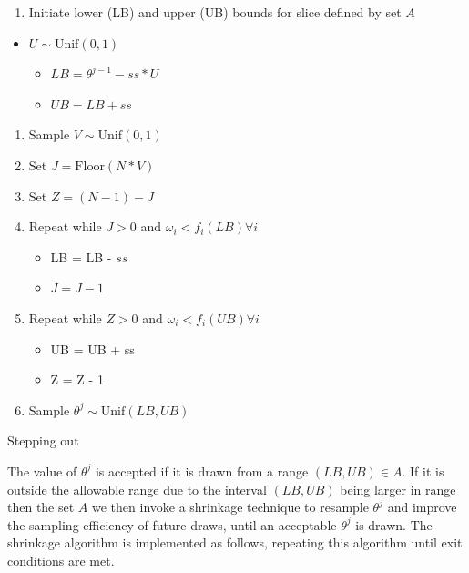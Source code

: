 \documentclass[article]{jss}
\begin{document}
%
\begin{algorithm}[H]
\begin{enumerate}
\item Initiate lower (LB) and upper (UB) bounds for slice defined by set
$A$\end{enumerate}
\begin{itemize}
\item $U\sim\mbox{Unif}(0,1)$ 

\begin{itemize}
\item $LB=\theta^{j-1}-ss*U$ 
\item $UB=LB+ss$ 
\end{itemize}
\end{itemize}
\begin{enumerate}
\item Sample $V\sim\mbox{Unif}(0,1)$ 
\item Set $J=\mbox{Floor}(N*V)$ 
\item Set $Z=(N-1)-J$ 
\item Repeat while $J>0$ and $\omega_{i}<f_{i}(LB)\forall i$

\begin{itemize}
\item LB = LB - $ss$ 
\item $J=J-1$ 
\end{itemize}
\item Repeat while $Z>0$ and $\omega_{i}<f_{i}(UB)\forall i$

\begin{itemize}
\item UB = UB + ss 
\item Z = Z - 1 
\end{itemize}
\item Sample $\theta^{j}\sim\mbox{Unif}(LB,UB)$ 
\end{enumerate}
\caption{Stepping out}
\label{alg:steppingout}
\end{algorithm}


The value of $\theta^{j}$ is accepted if it is drawn from a range
$(LB,UB)\in A$. If it is outside the allowable range due to the
interval $(LB,UB)$ being larger in range then the set $A$ we then
invoke a shrinkage technique to resample $\theta^{j}$ and improve the
sampling efficiency of future draws, until an acceptable $\theta^{j}$
is drawn.  The shrinkage algorithm is implemented as follows,
repeating this algorithm until exit conditions are met.
\end{document}
